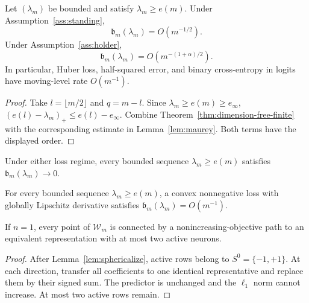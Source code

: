 \documentclass[smallextended,envcountsect]{svjour3}
\newcommand{\SubBar}{\mathfrak b}
\begin{document}
\begin{corollary}\label{cor:transfer}
Let $(\lambda_m)$ be bounded and satisfy $\lambda_m\ge e(m)$.  Under
Assumption~\ref{ass:standing},
\begin{equation}
 \boxed{\SubBar_m(\lambda_m)=O(m^{-1/2})}.
 \label{eq:moving-lipschitz-rate}
\end{equation}
Under Assumption~\ref{ass:holder},
\begin{equation}
 \boxed{\SubBar_m(\lambda_m)
 =O\!\left(m^{-(1+\alpha)/2}\right)}.
 \label{eq:moving-holder-rate}
\end{equation}
In particular, Huber loss, half-squared error, and binary cross-entropy in logits
have moving-level rate $O(m^{-1})$.
\end{corollary}

\begin{proof}
Take $l=\lfloor m/2\rfloor$ and $q=m-l$.  Since
$\lambda_m\ge e(m)\ge e_\infty$,
$(e(l)-\lambda_m)_+\le e(l)-e_\infty$.  Combine
Theorem~\ref{thm:dimension-free-finite} with the corresponding estimate in
Lemma~\ref{lem:maurey}.  Both terms have the displayed order.
\end{proof}

\begin{corollary}\label{cor:qualitative}
Under either loss regime, every bounded sequence $\lambda_m\ge e(m)$ satisfies
$\SubBar_m(\lambda_m)\to0$.
\end{corollary}

\begin{corollary}\label{cor:near-optimal}
For every bounded sequence $\lambda_m\ge e(m)$, a convex nonnegative loss with
globally Lipschitz derivative satisfies $\SubBar_m(\lambda_m)=O(m^{-1})$.
\end{corollary}

\begin{lemma}\label{lem:two-ray}
If $n=1$, every point of $\mathcal W_m$ is connected by a
nonincreasing-objective path to an equivalent representation with at most two
active neurons.
\end{lemma}

\begin{proof}
After Lemma~\ref{lem:sphericalize}, active rows belong to
$S^0=\{-1,+1\}$.  At each direction, transfer all coefficients to one
identical representative and replace them by their signed sum.  The predictor
is unchanged and the $\ell_1$ norm cannot increase.  At most two active rows
remain.
\end{proof}
\end{document}
